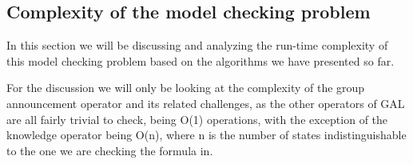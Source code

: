 %


\subsection{Complexity of the model checking problem}

In this section we will be discussing and analyzing the run-time complexity of this model checking problem based on the algorithms we have presented so far.

For the discussion we will only be looking at the complexity of the group announcement operator and its related challenges, as the other operators of GAL are all fairly trivial to check, being O(1) operations, with the exception of the knowledge operator being O(n), where n is the number of states indistinguishable to the one we are checking the formula in.

